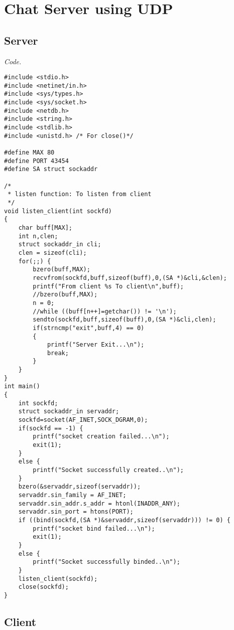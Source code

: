 \documentclass[12pt]{article}
\begin{document}
\section{Chat Server using UDP}

\subsection{Server}

\textit{Code.}

\begin{lstlisting}
#include <stdio.h>
#include <netinet/in.h>
#include <sys/types.h>
#include <sys/socket.h>
#include <netdb.h>
#include <string.h>
#include <stdlib.h>
#include <unistd.h> /* For close()*/

#define MAX 80
#define PORT 43454
#define SA struct sockaddr

/*
 * listen function: To listen from client
 */
void listen_client(int sockfd)
{
	char buff[MAX];
	int n,clen;
	struct sockaddr_in cli;
	clen = sizeof(cli);
	for(;;) {
		bzero(buff,MAX);
		recvfrom(sockfd,buff,sizeof(buff),0,(SA *)&cli,&clen);
		printf("From client %s To client\n",buff);
		//bzero(buff,MAX);
		n = 0;
		//while ((buff[n++]=getchar()) != '\n');
		sendto(sockfd,buff,sizeof(buff),0,(SA *)&cli,clen);
		if(strncmp("exit",buff,4) == 0)
		{
			printf("Server Exit...\n");
			break;
		}
	}
}
int main()
{
	int sockfd;
	struct sockaddr_in servaddr;
	sockfd=socket(AF_INET,SOCK_DGRAM,0);
	if(sockfd == -1) {
		printf("socket creation failed...\n");
		exit(1);
	}
	else {
		printf("Socket successfully created..\n");
	}
	bzero(&servaddr,sizeof(servaddr));
	servaddr.sin_family = AF_INET;
	servaddr.sin_addr.s_addr = htonl(INADDR_ANY);
	servaddr.sin_port = htons(PORT);
	if ((bind(sockfd,(SA *)&servaddr,sizeof(servaddr))) != 0) {
		printf("socket bind failed...\n");
		exit(1);
	}
	else {
		printf("Socket successfully binded..\n");
	}
	listen_client(sockfd);
	close(sockfd);
}

\end{lstlisting}

\subsection{Client}
\end{document}
